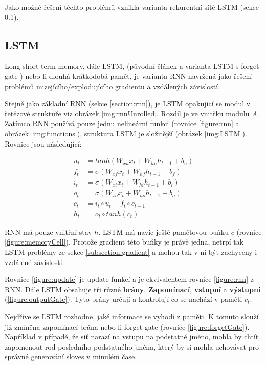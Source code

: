 Jako možné řešení těchto problémů vznikla varianta rekurentní sítě LSTM (sekce \ref{section:LSTM}).




\subsection{LSTM}\label{section:LSTM}
Long short term memory, dále LSTM, (původní článek \cite{LSTM} a varianta LSTM s forget gate \cite{forgetLSTM}) nebo-li dlouhá krátkodobá paměť, je varianta RNN navržená jako řešení problémů mizejícího/explodujícího gradientu a vzdálených závislostí.

Stejně jako základní RNN (sekce \ref{section:rnn}), je LSTM opakující se modul v řetězové struktuře viz obrázek \ref{img:rnnUnrolled}. Rozdíl je ve vnitřku modulu $A$. Zatímco RNN používá pouze jednu nelineární funkci (rovnice \ref{figure:rnn} a obrázek \ref{img:functions}), struktura LSTM je složitější (obrázek \ref{img:LSTM}). Rovnice jsou následující:

\begin{align}
    u_{t}&=tanh(W_{xu}x_t + W_{hu}h_{t-1} + b_u) \label{figure:update} \\
    f_{t}&=\sigma(W_{xf}x_{t}+W_{hf}h_{t-1}+b_{f}) \label{figure:forgetGate} \\
    i_{t}&=\sigma(W_{xi}x_{t}+W_{hi}h_{t-1}+b_{i}) \label{figure:inputGate} \\
    o_{t}&=\sigma(W_{xo}x_{t}+W_{ho}h_{t-1}+b_{o}) \label{figure:outputGate} \\
    c_{t}&=i_{t}\circ u_{t}+f_{t}\circ c_{t-1}\label{figure:memoryCell} \\
    h_{t}&=o_{t}\circ tanh(c_{t}) \label{figure:hiddenState}
\end{align}


RNN má pouze vnitřní stav $h$. LSTM má navíc ještě paměťovou buňku $c$ (rovnice \ref{figure:memoryCell}). Protože gradient této buňky je právě jedna, netrpí tak LSTM problémy ze sekce \ref{subsection:gradient} a mohou tak v ní být zachyceny i vzdálené závislosti.

Rovnice \ref{figure:update} je update funkcí a je ekvivalentem rovnice \ref{figure:rnn} z RNN.
Dále LSTM obsahuje tři různé \textbf{brány}. \textbf{Zapomínací}, \textbf{vstupní} a \textbf{výstupní} (\ref{figure:outputGate}). Tyto brány určují a kontrolují co se nachází v paměti $c_t$.

Nejdříve se LSTM rozhodne, jaké informace se vyhodí z paměti. K tomuto slouží již zmíněna zapomínací brána nebo-li forget gate (rovnice \ref{figure:forgetGate}). Například v případě, že síť narazí na vstupu na podstatné jméno, mohla by chtít zapomenout rod posledního podstatného jména, který by si mohla uchovávat pro správné generování sloves v minulém čase.


